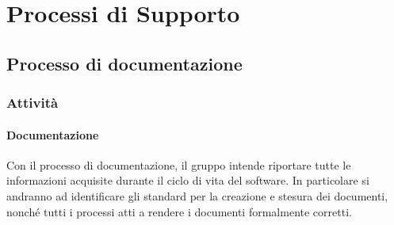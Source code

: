

\section{Processi di Supporto}

	\subsection{Processo di documentazione}
	
		\subsubsection{Attività}

			\paragraph{Documentazione}
			Con il processo di documentazione, il gruppo \groupName{} intende riportare tutte le informazioni acquisite durante il ciclo di vita del software.
			In particolare si andranno ad identificare gli standard per la creazione e stesura dei documenti, nonché tutti i processi atti a rendere i documenti formalmente corretti.



